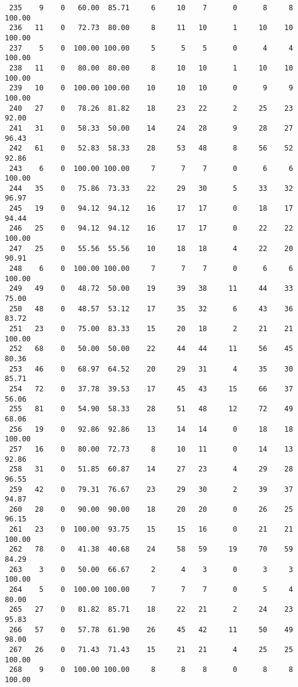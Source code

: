 \begin{verbatim}
 235    9    0   60.00  85.71     6     10    7      0      8     8   100.00
 236   11    0   72.73  80.00     8     11   10      1     10    10   100.00
 237    5    0  100.00 100.00     5      5    5      0      4     4   100.00
 238   11    0   80.00  80.00     8     10   10      1     10    10   100.00
 239   10    0  100.00 100.00    10     10   10      0      9     9   100.00
 240   27    0   78.26  81.82    18     23   22      2     25    23    92.00
 241   31    0   58.33  50.00    14     24   28      9     28    27    96.43
 242   61    0   52.83  58.33    28     53   48      8     56    52    92.86
 243    6    0  100.00 100.00     7      7    7      0      6     6   100.00
 244   35    0   75.86  73.33    22     29   30      5     33    32    96.97
 245   19    0   94.12  94.12    16     17   17      0     18    17    94.44
 246   25    0   94.12  94.12    16     17   17      0     22    22   100.00
 247   25    0   55.56  55.56    10     18   18      4     22    20    90.91
 248    6    0  100.00 100.00     7      7    7      0      6     6   100.00
 249   49    0   48.72  50.00    19     39   38     11     44    33    75.00
 250   48    0   48.57  53.12    17     35   32      6     43    36    83.72
 251   23    0   75.00  83.33    15     20   18      2     21    21   100.00
 252   68    0   50.00  50.00    22     44   44     11     56    45    80.36
 253   46    0   68.97  64.52    20     29   31      4     35    30    85.71
 254   72    0   37.78  39.53    17     45   43     15     66    37    56.06
 255   81    0   54.90  58.33    28     51   48     12     72    49    68.06
 256   19    0   92.86  92.86    13     14   14      0     18    18   100.00
 257   16    0   80.00  72.73     8     10   11      0     14    13    92.86
 258   31    0   51.85  60.87    14     27   23      4     29    28    96.55
 259   42    0   79.31  76.67    23     29   30      2     39    37    94.87
 260   28    0   90.00  90.00    18     20   20      0     26    25    96.15
 261   23    0  100.00  93.75    15     15   16      0     21    21   100.00
 262   78    0   41.38  40.68    24     58   59     19     70    59    84.29
 263    3    0   50.00  66.67     2      4    3      0      3     3   100.00
 264    5    0  100.00 100.00     7      7    7      0      5     4    80.00
 265   27    0   81.82  85.71    18     22   21      2     24    23    95.83
 266   57    0   57.78  61.90    26     45   42     11     50    49    98.00
 267   26    0   71.43  71.43    15     21   21      4     25    25   100.00
 268    9    0  100.00 100.00     8      8    8      0      8     8   100.00

\end{verbatim}
